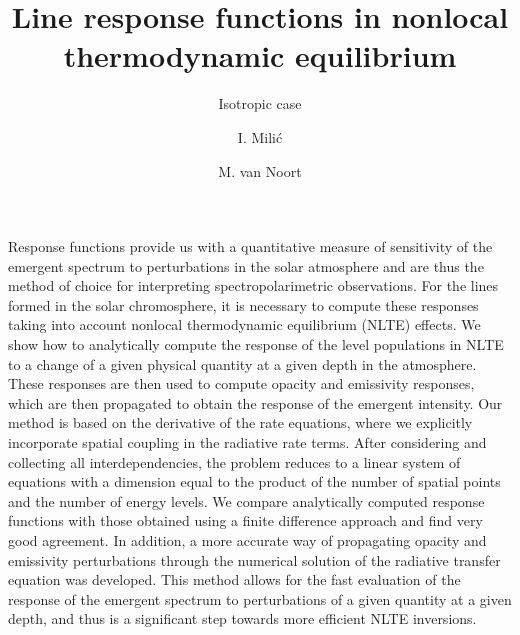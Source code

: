 \documentclass[referee]{aa}
\begin{document}
   \title{Line response functions in nonlocal thermodynamic equilibrium}

   \subtitle{Isotropic case}

   \author{I. Mili\'{c}
   \and
   M. van Noort}
   

   \date{}


  \abstract
   {Response functions provide us with a quantitative measure of sensitivity of the emergent spectrum to perturbations in the solar atmosphere and are thus the method of choice for interpreting  spectropolarimetric observations. For the lines formed in the solar chromosphere, it is necessary to compute these responses taking into account nonlocal thermodynamic equilibrium (NLTE) effects.}  
  {We show how to analytically compute the response of the level populations in NLTE to a change of a given physical quantity at a given depth in the atmosphere. These responses are then used to compute opacity and emissivity responses, which are then propagated to obtain the response of the emergent intensity.}
   {Our method is based on the derivative of the rate equations, where we explicitly incorporate spatial coupling in the radiative rate terms. After considering and collecting all interdependencies, the problem reduces to a linear system of equations with a dimension equal to the product of the number of spatial points and the number of energy levels.}
   {We compare analytically computed response functions with those obtained using a finite difference approach and find very good agreement. In addition, a more accurate way of propagating opacity and emissivity perturbations through the numerical solution of the radiative transfer equation was developed.} 
   {This method allows for the fast evaluation of the response of the emergent spectrum to perturbations of a given quantity at a given depth, and thus is a significant step towards more efficient NLTE inversions.}
 
\end{document}

